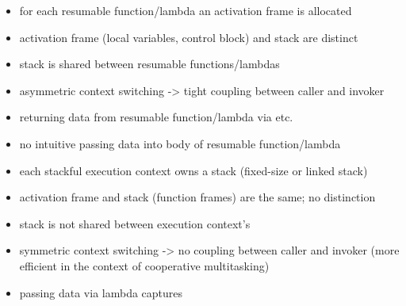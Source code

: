 \begin{itemize}
    \item   for each resumable function/lambda an activation frame is allocated
    \item   activation frame (local variables, control block) and stack are
            distinct
    \item   stack is shared between resumable functions/lambdas
    \item   asymmetric context switching -> tight coupling between caller and
            invoker
    \item   returning data from resumable function/lambda via \yield etc.
    \item   no intuitive passing data into body of resumable function/lambda
\end{itemize}

\begin{itemize}
    \item   each stackful execution context owns a stack (fixed-size or linked
            stack)
    \item   activation frame and stack (function frames) are the same; no
            distinction
    \item   stack is not shared between execution context's
    \item   symmetric context switching -> no coupling between caller and
            invoker (more efficient in the context of cooperative multitasking)
    \item   passing data via lambda captures
\end{itemize}
